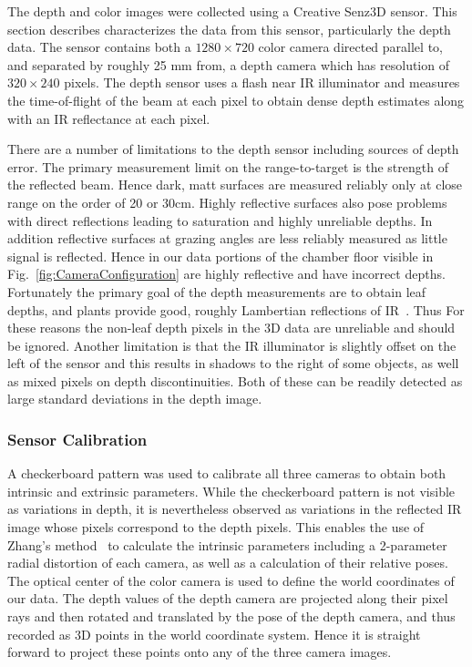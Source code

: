 The depth and color images were collected using a Creative Senz3D sensor.
This section describes characterizes the data from this sensor, particularly the depth data.
The sensor contains both a $1280 \times 720$ color camera directed parallel to, and separated by roughly 25 mm from, a depth camera which has resolution of $320\times240$ pixels.
The depth sensor uses a flash near IR illuminator and measures the time-of-flight of the beam at each pixel to obtain dense depth estimates along with an IR reflectance at each pixel.

There are a number of limitations to the depth sensor including sources of depth error.  The primary measurement limit on the range-to-target is the strength of the reflected beam. Hence dark, matt surfaces are measured reliably only at close range on the order of 20 or 30cm.  Highly reflective surfaces also pose problems with direct reflections leading to saturation and highly unreliable depths.  In addition reflective surfaces at grazing angles are less reliably measured as little signal is reflected.  Hence in our data portions of the chamber floor visible in Fig.~\ref{fig:CameraConfiguration} are highly reflective and have incorrect depths.  Fortunately the primary goal of the depth measurements are to obtain leaf depths, and plants provide good, roughly Lambertian reflections of IR~\cite{Chelle2006219}.  Thus For these reasons the non-leaf depth pixels in the 3D data are unreliable and should be ignored.  Another limitation is that the IR illuminator is slightly offset on the left of the sensor and this results in shadows to the right of some objects, as well as mixed pixels on depth discontinuities.  Both of these can be readily detected as large standard deviations in the depth image.

\subsubsection{Sensor Calibration}

A checkerboard pattern was used to calibrate all three cameras to obtain both intrinsic and extrinsic parameters.  While the checkerboard pattern is not visible as variations in depth, it is nevertheless observed as variations in the reflected IR image whose pixels correspond to the depth pixels.  This enables the use of Zhang's method~\cite{Zhang2000} to calculate the intrinsic parameters including a 2-parameter radial distortion of each camera, as well as a calculation of their relative poses.  The optical center of the color camera is used to define the world coordinates of our data.  The depth values of the depth camera are projected along their pixel rays and then rotated and translated by the pose of the depth camera, and thus recorded as 3D points in the world coordinate system.  Hence it is straight forward to project these points onto any of the three camera images.

